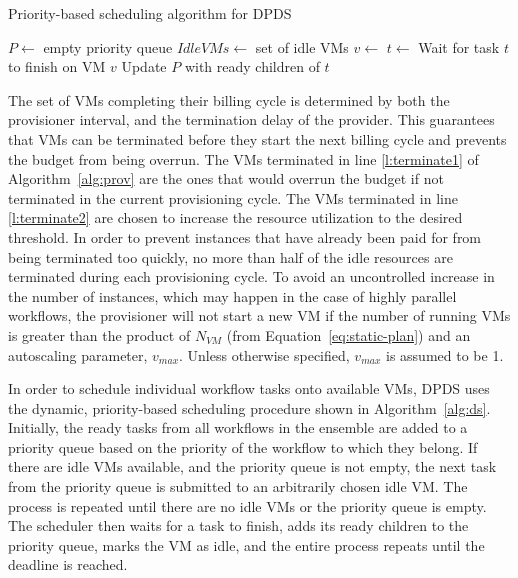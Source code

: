 \documentclass[preprint,5p]{elsarticle}
\begin{document}
\begin{algorithm}[tb]
\caption{Priority-based scheduling algorithm for DPDS}
\label{alg:ds}
{\footnotesize
\begin{algorithmic}[1]
    \State $P\gets$ empty priority queue
  \State $IdleVMs\gets$ set of idle VMs
      \State {} 
    \EndFor
        \State $v\gets$ 
        \State $t\gets$ 
        \State {}
      \EndWhile
      \State Wait for task $t$ to finish on VM $v$
      \State Update $P$ with ready children of $t$
    \State {}
    \EndWhile
\EndProcedure
\end{algorithmic}
}
\end{algorithm}

The set of VMs completing their billing cycle is determined by both
the provisioner interval, and the termination delay of the provider. This
guarantees that VMs can be terminated before they start the next billing cycle
and prevents the budget from being overrun. The VMs terminated in line
\ref{l:terminate1} of Algorithm~\ref{alg:prov} are the ones that would overrun
the budget if not terminated in the current provisioning cycle. The VMs
terminated in line \ref{l:terminate2} are chosen to increase the resource
utilization to the desired threshold. In order to prevent instances that have
already been paid for from being terminated too quickly, no more than half of
the idle resources are terminated during each provisioning cycle. To avoid an
uncontrolled increase in the number of instances, which may happen in the case
of highly parallel workflows, the provisioner will not start a new VM if the
number of running VMs is greater than the product of $N_{VM}$ (from
Equation~\ref{eq:static-plan}) and an autoscaling parameter, $v_{max}$. Unless
otherwise specified, $v_{max}$ is assumed to be 1.

In order to schedule individual workflow tasks onto available VMs, DPDS uses the
dynamic, priority-based scheduling procedure shown in Algorithm~\ref{alg:ds}.
Initially, the ready tasks from all workflows in the ensemble are added to a
priority queue based on the priority of the workflow to which they belong. If
there are idle VMs available, and the priority queue is not empty, the next task
from the priority queue is submitted to an arbitrarily chosen idle VM. The
process is repeated until there are no idle VMs or the priority queue is empty.
The scheduler then waits for a task to finish, adds its ready children to the
priority queue, marks the VM as idle, and the entire process repeats until the
deadline is reached.
\end{document}
